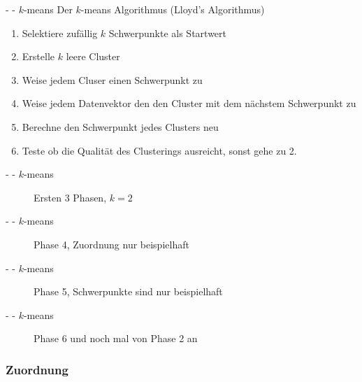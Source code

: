 \documentclass[fleqn,11pt,aspectratio=43]{beamer}
\begin{document}
\begin{frame}{\insertsectionhead - \insertsubsectionhead - $k$-means \cite{dwh}}
Der $k$-means Algorithmus (Lloyd's Algorithmus)
\begin{enumerate}[label=\bfseries\arabic*.]
\item Selektiere zufällig $k$ Schwerpunkte als Startwert
\item Erstelle $k$ leere Cluster
\item Weise jedem Cluser einen Schwerpunkt zu
\item Weise jedem Datenvektor den den Cluster mit dem nächstem Schwerpunkt zu
\item Berechne den Schwerpunkt jedes Clusters neu
\item Teste ob die Qualität des Clusterings ausreicht, sonst gehe zu 2.
\end{enumerate}
\end{frame}

\begin{frame}{\insertsectionhead - \insertsubsectionhead - $k$-means}
\begin{figure}
\scalebox{1.1}{}
\caption{Ersten 3 Phasen, $k = 2$}
\end{figure}
\end{frame}

\begin{frame}{\insertsectionhead - \insertsubsectionhead - $k$-means}
\begin{figure}
\scalebox{1.1}{}
\caption{Phase 4, Zuordnung nur beispielhaft}
\end{figure}
\end{frame}

\begin{frame}{\insertsectionhead - \insertsubsectionhead - $k$-means}
\begin{figure}
\scalebox{1.1}{}
\caption{Phase 5, Schwerpunkte sind nur beispielhaft}
\end{figure}
\end{frame}

\begin{frame}{\insertsectionhead - \insertsubsectionhead - $k$-means}
\begin{figure}
\scalebox{1.1}{}
\caption{Phase 6 und noch mal von Phase 2 an}
\end{figure}
\end{frame}

\subsubsection{Zuordnung}
\end{document}

